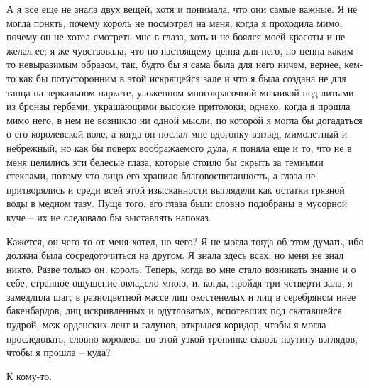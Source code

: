 А я все еще не знала двух вещей, хотя и понимала, что они самые важные.
Я не могла понять, почему король не посмотрел на  меня,  когда  я  проходила
мимо, почему он не хотел смотреть мне в глаза, хоть и не боялся моей красоты
и  не желал ее; я же чувствовала, что по-настоящему ценна для него, но ценна
каким-то невыразимым образом, так, будто бы я  сама  была  для  него  ничем,
вернее,  кем-то  как  бы  потусторонним  в этой искрящейся зале и что я была
создана  не  для  танца  на  зеркальном  паркете,  уложенном  многокрасочной
мозаикой  под  литыми  из  бронзы  гербами,  украшающими  высокие притолоки;
однако, когда я прошла мимо него, в нем  не  возникло  ни  одной  мысли,  по
которой  я могла бы догадаться о его королевской воле, а когда он послал мне
вдогонку взгляд, мимолетный и небрежный,  но  как  бы  поверх  воображаемого
дула,  я  поняла еще и то, что не в меня целились эти белесые глаза, которые
стоило  бы  скрыть  за  темными  стеклами,  потому  что  лицо  его   хранило
благовоспитанность,  а  глаза не притворялись и среди всей этой изысканности
выглядели как остатки грязной воды в медном тазу. Пуще того, его глаза  были
словно подобраны в мусорной куче -- их не следовало бы выставлять напоказ.

Кажется,  он  чего-то  от меня хотел, но чего? Я не могла тогда об этом
думать, ибо должна была сосредоточиться на другом. Я знала  здесь  всех,  но
меня  не  знал  никто.  Разве  только он, король. Теперь, когда во мне стало
возникать знание и о себе, странное ощущение овладело мною, и, когда, пройдя
три четверти зала, я замедлила шаг, в разноцветной массе лиц  окостенелых  и
лиц   в   серебряном  инее  бакенбардов,  лиц  искривленных  и  одутловатых,
вспотевших под скатавшейся пудрой, меж орденских лент  и  галунов,  открылся
коридор, чтобы я могла проследовать, словно королева, по этой узкой тропинке
сквозь паутину взглядов, чтобы я прошла -- куда?

К кому-то.


